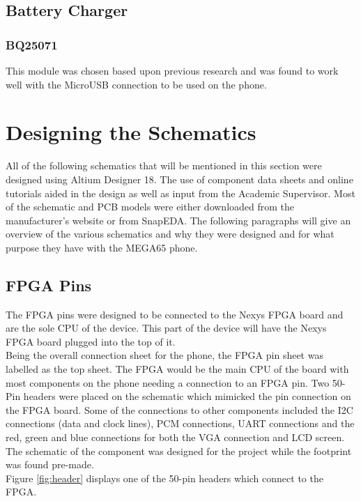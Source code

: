 \subsection{Battery Charger}
\subsubsection{BQ25071}
	This module was chosen based upon previous research and was found to work well with the MicroUSB connection to be used on the phone. 
		

\section{Designing the Schematics}
\label{chap5sec2}

	All of the following schematics that will be mentioned in this section were designed using Altium Designer 18. 
The use of component data sheets and online tutorials aided in the design as well as input from the Academic Supervisor. 
Most of the schematic and PCB models were either downloaded from the manufacturer's website or from SnapEDA. 
The following paragraphs will give an overview of the various schematics and why they were designed and for what purpose they have with the MEGA65 phone.

\subsection{FPGA Pins}
\label{chap:FPGA}
	The FPGA pins were designed to be connected to the Nexys FPGA board and are the sole CPU of the device. 
This part of the device will have the Nexys FPGA board plugged into the top of it.\\
Being the overall connection sheet for the phone, the FPGA pin sheet was labelled as the top sheet. 
The FPGA would be the main CPU of the board with most components on the phone needing a connection to an FPGA pin. 
Two 50-Pin headers were placed on the schematic which mimicked the pin connection on the FPGA board. 
Some of the connections to other components included the I2C connections (data and clock lines), PCM connections, UART connections and the red, green and blue connections for both the VGA connection and LCD screen.\\
The schematic of the component was designed for the project while the footprint was found pre-made.\\
Figure \ref{fig:header} displays one of the 50-pin headers which connect to the FPGA.

